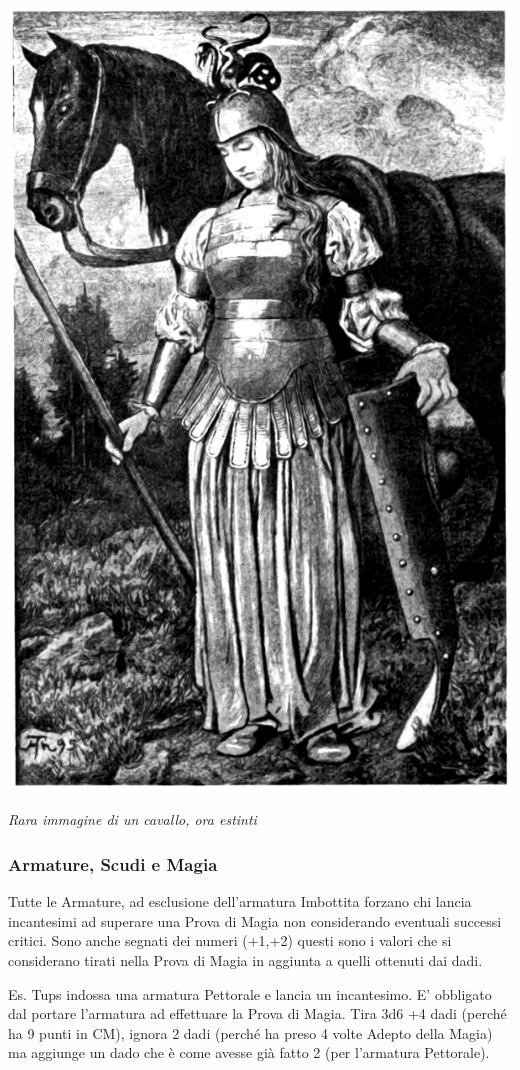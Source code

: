 \begin{multicols}{2}
\begin{center}
	\includegraphics[width=0.75\linewidth]{immagini/donnacavalierecavallo.png}

	\textit{Rara immagine di un cavallo, ora estinti}
\end{center}

\subsubsection{Armature, Scudi e Magia}\hypertarget{armatureemagie}{}\label{armatureemagie}

Tutte le Armature, ad esclusione dell'armatura Imbottita forzano chi lancia incantesimi ad superare una Prova di Magia non considerando eventuali successi critici. Sono anche segnati dei numeri (+1,+2) questi sono i valori che si considerano tirati nella Prova di Magia in aggiunta a quelli ottenuti dai dadi.

Es. Tups indossa una armatura Pettorale e lancia un incantesimo. E' obbligato dal portare l'armatura ad effettuare la Prova di Magia. Tira 3d6 +4 dadi (perché ha 9 punti in CM), ignora 2 dadi (perché ha preso 4 volte Adepto della Magia) ma aggiunge un dado che è come avesse già fatto 2 (per l'armatura Pettorale).


\end{multicols}
